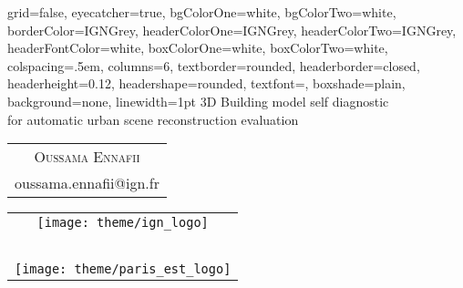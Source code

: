 \documentclass[portrait, a0paper, margin=.5cm]{baposter}
\begin{document}
    \begin{poster}%
    {
        grid=false,
        eyecatcher=true,
        bgColorOne=white,
        bgColorTwo=white,
        borderColor=IGNGrey,
        headerColorOne=IGNGrey,
        headerColorTwo=IGNGrey,
        headerFontColor=white,
        boxColorOne=white,
        boxColorTwo=white,
        colspacing=.5em,
        columns=6,
        textborder=rounded,
        headerborder=closed,
        headerheight=0.12\textheight,
        headershape=rounded,
        textfont={\color{IGNDarkGrey}},
        boxshade=plain,
        background=none,
        linewidth=1pt
    }
    {}
    {
        \color{IGNDarkGrey}
        3D Building model self diagnostic\\ for automatic urban scene reconstruction evaluation
    }
    {
        \vspace{.5cm}
        \color{IGNDarkGrey}
        \begin{tabular}{c}
            \textsc{Oussama Ennafii}\\
            \small oussama.ennafii@ign.fr
        \end{tabular}
    }
    {
        \begin{tabular}{c}
            \texttt{[image: theme/ign\_logo]}\\~\\
            \texttt{[image: theme/paris\_est\_logo]}
        \end{tabular}
    }




\end{poster}
\end{document}
